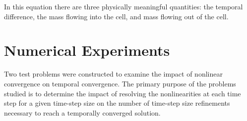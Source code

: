In this equation there are three physically meaningful quantities: the temporal difference, the mass flowing into the cell, and mass flowing out of the cell.

\section{Numerical Experiments}
\label{sect:numerical_experiments}

Two test problems were constructed to examine the impact of nonlinear convergence on temporal convergence.
The primary purpose of the problems studied is to determine the impact of resolving the nonlinearities at each time step for a given time-step size on the number of time-step size refinements necessary to reach a temporally converged solution.

